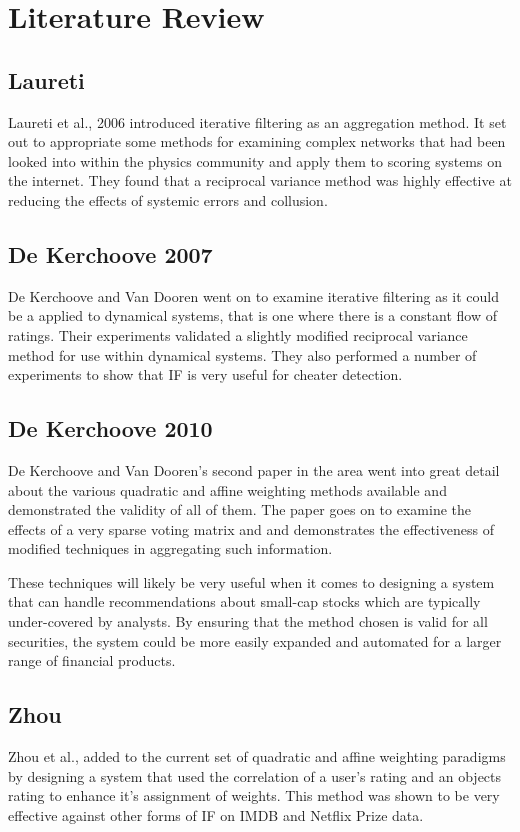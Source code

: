 \chapter{Literature Review}

\section{Laureti}
Laureti et al., 2006 introduced iterative filtering as an aggregation method. It set out to appropriate some methods for examining complex networks that had been looked into within the physics community and apply them to scoring systems on the internet. They found that a reciprocal variance method was highly effective at reducing the effects of systemic errors and collusion.

\section{De Kerchoove 2007}
De Kerchoove and Van Dooren went on to examine iterative filtering as it could be a applied to dynamical systems, that is one where there is a constant flow of ratings. Their experiments validated a slightly modified reciprocal variance method for use within dynamical systems. They also performed a number of experiments to show that IF is very useful for cheater detection. 

\section{De Kerchoove 2010}
De Kerchoove and Van Dooren's second paper in the area went into great detail about the various quadratic and affine weighting methods available and demonstrated the validity of all of them. The paper goes on to examine the effects of a very sparse voting matrix and and demonstrates the effectiveness of modified techniques in aggregating such information.

These techniques will likely be very useful when it comes to designing a system that can handle recommendations about small-cap stocks which are typically under-covered by analysts. By ensuring that the method chosen is valid for all securities, the system could be more easily expanded and automated for a larger range of financial products.


\section{Zhou}
Zhou et al., added to the current set of quadratic and affine weighting paradigms by designing a system that used the correlation of a user's rating and an objects rating to enhance it's assignment of weights. This method was shown to be very effective against other forms of IF on IMDB and Netflix Prize data.

